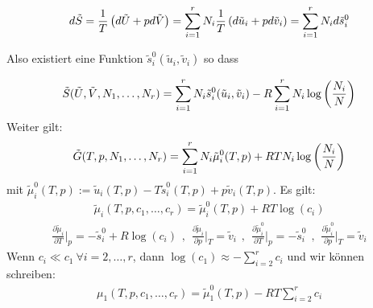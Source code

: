 \vspace{-5pt}

\begin{align*}
    d \tilde{S} = \frac{1}{T} \left( d \tilde{U} + p d \tilde{V} \right)
    = \sum_{i=1}^r N_i \frac{1}{T} \left( d \tilde{u}_i + p d \tilde{v}_i \right)
    = \sum_{i=1}^r N_i d \tilde{s}_i^0
\end{align*}

\vspace{-5pt}

Also existiert eine Funktion $\tilde{s}_i^0 (\tilde{u}_i,\tilde{v}_i)$ so dass

\vspace{-5pt}

\begin{align*}
    \tilde{S}(\tilde{U},\tilde{V},N_1,\dots,N_r)
    = \sum_{i=1}^r N_i \tilde{s}_i^0 (\tilde{u}_i,\tilde{v}_i) - R \sum_{i=1}^r N_i \log \left( \frac{N_i}{N} \right)
\end{align*}
Weiter gilt:
\begin{align*}
    \tilde{G}(T,p,N_1,\dots,N_r) =
    \sum_{i=1}^r N_i \tilde{\mu}_i^0(T,p) + R T N_i \log \left( \frac{N_i}{N} \right)
\end{align*}
mit $\tilde{\mu}_i^0 (T,p) := \tilde{u}_i(T,p) - T \tilde{s}_i^0 (T,p) + p \tilde{v}_i (T,p)$.
Es gilt:
\begin{align*}
    \tilde{\mu}_i (T,p,c_1,\dots,c_r) = \tilde{\mu}_i^0 (T,p) + R T \log(c_i)
\end{align*}
\begin{align*}
    \frac{\partial \tilde{\mu}_i}{\partial T} \Big|_p = - \tilde{s}_i^0 + R \log(c_i)
    \hspace{5pt} , \hspace{5pt}
    \frac{\partial \tilde{\mu}_i}{\partial p} \Big|_T = \tilde{v}_i
    \hspace{5pt} , \hspace{5pt}
    \frac{\partial \tilde{\mu}_i^0}{\partial T} \Big|_p = - \tilde{s}_i^0
    \hspace{5pt} , \hspace{5pt}
    \frac{\partial \tilde{\mu}_i^0}{\partial p} \Big|_T = \tilde{v}_i
\end{align*}
Wenn $c_i \ll c_1 \ \forall i = 2,\dots,r$, dann $\log(c_1) \approx - \sum_{i=2}^r c_i$
und wir können schreiben:
\begin{align*}
    \mu_1 (T,p,c_1,\dots,c_r) = \tilde{\mu}_1^0 (T,p) - R T \sum_{i=2}^r c_i
\end{align*}

